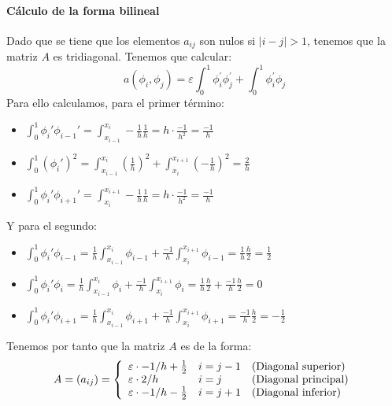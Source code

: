 \documentclass[spanish]{mathnotes}
\begin{document}
	\paragraph{Cálculo de la forma bilineal}
	Dado que se tiene que los elementos $a_{ij}$ son nulos si $|i-j|>1$, tenemos que la matriz $A$ es tridiagonal. Tenemos que calcular:
	$$a(\phi_i, \phi_j) = \varepsilon\int_{0}^{1} \phi_i^\prime\phi_j^\prime + \int_{0}^{1}\phi_i^\prime\phi_j$$
	Para ello calculamos, para el primer término:
	\begin{itemize}
		\item $\int_{0}^{1} \phi_i'\phi_{i-1}' = \int_{x_{i-1}}^{x_i} -\frac{1}{h}\frac{1}{h} = h\cdot\frac{-1}{h^2} = \frac{-1}{h}$
		
		\item $\int_{0}^{1}(\phi_i')^2 = \int_{x_{i-1}}^{x_i}\left(\frac{1}{h}\right)^2 + \int_{x_i}^{x_{i+1}} \left(-\frac{1}{h}\right)^2 = \frac{2}{h}$
		
		\item $\int_0^1 \phi_i'\phi_{i+1}'=\int_{x_i}^{x_{i+1}}-\frac{1}{h}\frac{1}{h} = h\cdot\frac{-1}{h^2} = \frac{-1}{h}$
	\end{itemize}
	Y para el segundo:
	\begin{itemize}
		\item $\int_{0}^{1} \phi_i'\phi_{i-1} =
		\frac{1}{h}\int_{x_{i-1}}^{x_{i}}\phi_{i-1}  + \frac{-1}{h}\int_{x_{i}}^{x_{i+1}} \phi_{i-1} =
		\frac{1}{h}\frac{h}{2} = \frac{1}{2}$
		
		\item $\int_{0}^{1} \phi_i'\phi_{i} =
		\frac{1}{h}\int_{x_{i-1}}^{x_{i}}\phi_{i}  + \frac{-1}{h}\int_{x_{i}}^{x_{i+1}} \phi_{i}
		= \frac{1}{h}\frac{h}{2} + \frac{-1}{h}\frac{h}{2} = 0$
		
		\item $\int_{0}^{1} \phi_i'\phi_{i+1} =
		\frac{1}{h}\int_{x_{i-1}}^{x_{i}}\phi_{i+1}  + \frac{-1}{h}\int_{x_{i}}^{x_{i+1}} \phi_{i+1} =
		\frac{-1}{h}\frac{h}{2} = -\frac{1}{2}$
	\end{itemize}
	Tenemos por tanto que la matriz $A$ es de la forma:
	\begin{equation*}
		A = (a_{ij}) = 
		\left\{
		\begin{array}{l l l}
			\varepsilon \cdot {-1}/{h} + \frac{1}{2} & i = j-1 & \text{(Diagonal superior)}\\
			\varepsilon \cdot {2}/{h} & i = j & \text{(Diagonal principal)}\\
			\varepsilon \cdot {-1}/{h} - \frac{1}{2} & i = j+1 &  \text{(Diagonal inferior)}
		\end{array}
		\right.
	\end{equation*}
\end{document}
